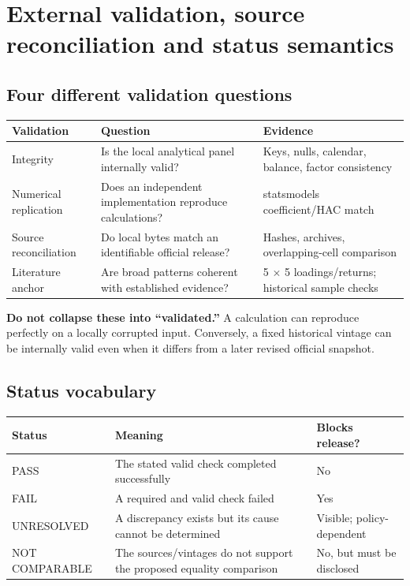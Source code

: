 \hypertarget{external}{}
\hypertarget{external-validation-source-reconciliation-and-status-semantics}{%
\chapter{External validation, source reconciliation and status
semantics}\label{external-validation-source-reconciliation-and-status-semantics}}

\hypertarget{four-different-validation-questions}{%
\section{Four different validation
questions}\label{four-different-validation-questions}}

\begin{longtable}[]{@{}p{}p{}p{}@{}}
\toprule\noalign{}
Validation & Question & Evidence \\
\midrule\noalign{}
\endhead
\bottomrule\noalign{}
\endlastfoot
Integrity & Is the local analytical panel internally valid? & Keys,
nulls, calendar, balance, factor consistency \\
Numerical replication & Does an independent implementation reproduce
calculations? & statsmodels coefficient/HAC match \\
Source reconciliation & Do local bytes match an identifiable official
release? & Hashes, archives, overlapping-cell comparison \\
Literature anchor & Are broad patterns coherent with established
evidence? & 5 \ensuremath{\times } 5 loadings/returns; historical sample checks \\
\end{longtable}

\textbf{Do not collapse these into ``validated.''} A calculation can
reproduce perfectly on a locally corrupted input. Conversely, a fixed
historical vintage can be internally valid even when it differs from a
later revised official snapshot.

\hypertarget{status-vocabulary}{%
\section{Status vocabulary}\label{status-vocabulary}}

\begin{longtable}[]{@{}p{}p{}p{}@{}}
\toprule\noalign{}
Status & Meaning & Blocks release? \\
\midrule\noalign{}
\endhead
\bottomrule\noalign{}
\endlastfoot
{PASS} & The stated valid check completed successfully & No \\
{FAIL} & A required and valid check failed & Yes \\
{UNRESOLVED} & A discrepancy exists but its cause cannot be determined &
Visible; policy-dependent \\
{NOT COMPARABLE} & The sources/vintages do not support the proposed
equality comparison & No, but must be disclosed \\
\end{longtable}

